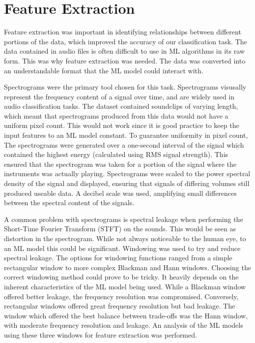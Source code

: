 \documentclass[class=report,11pt,crop=false]{standalone}
\begin{document}
\ifstandalone
\tableofcontents
\fi
\section{Feature Extraction \label{ch:Feature_Extraction}}

Feature extraction was important in identifying relationships between different portions of the data, which improved the accuracy of our classification task. The data contained in audio files is often difficult to use in ML algorithms in its raw form. This was why feature extraction was needed. The data was converted into an understandable format that the ML model could interact with. 

Spectrograms were the primary tool chosen for this task. Spectrograms visusally represent the frequency content of a signal over time, and are widely used in audio classification tasks. The dataset contained soundclips of varying length, which meant that spectrograms produced from this data would not have a uniform pixel count. This would not work since it is good practice to keep the input features to an ML model constant. To guarantee uniformity in pixel count, The spectrograms were generated over a one-second interval of the signal which contained the highest energy (calculated using RMS signal strength). This ensured that the spectrogram was taken for a portion of the signal where the instruments was actually playing. Spectrograms were scaled to the power spectral density of the signal and displayed, ensuring that signals of differing volumes still produced useable data. A decibel scale was used, amplifying small differences between the spectral content of the signals.

A common problem with spectrograms is spectral leakage when performing the Short-Time Fourier Transform (STFT) on the sounds. This would be seen as distortion in the spectrogram. While not always noticeable to the human eye, to an ML model this could be significant. Windowing was used to try and reduce spectral leakage. The options for windowing functions ranged from a simple rectangular window to more complex Blackman and Hann windows. Choosing the correct windowing method could prove to be tricky. It heavily depends on the inherent characteristics of the ML model being used. While a Blackman window offered better leakage, the frequency resolution was compromised. Conversely, rectangular windows offered great frequency resolution but bad leakage. The window which offered the best balance between trade-offs was the Hann window, with moderate frequency resolution and leakage. An analysis of the ML models using these three windows for feature extraction was performed.
\end{document}
